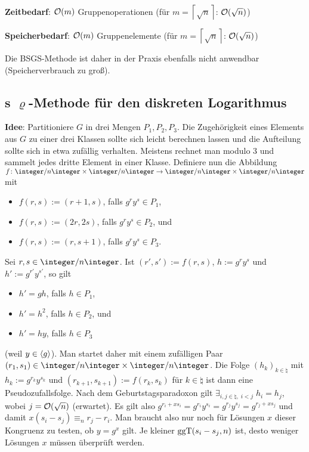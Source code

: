 \linie

\textbf{Zeitbedarf}:
$\mathcal{O}(m)$ Gruppenoperationen (für $m = \left\lceil\sqrt{n}\right\rceil$: $\mathcal{O}(\sqrt{n})$)

\textbf{Speicherbedarf}:
$\mathcal{O}(m)$ Gruppenelemente (für $m = \left\lceil\sqrt{n}\right\rceil$: $\mathcal{O}(\sqrt{n})$)

Die BSGS-Methode ist daher in der Praxis ebenfalls nicht anwendbar (Speicherverbrauch zu groß).

\pagebreak

\subsection{%
    s \texorpdfstring{$\varrho$}{ρ}-Methode für den diskreten Logarithmus%
}

\textbf{Idee}:
Partitioniere $G$ in drei Mengen $P_1, P_2, P_3$.
Die Zugehörigkeit eines Elements aus $G$ zu einer drei Klassen sollte sich leicht berechnen
lassen und die Aufteilung sollte sich in etwa zufällig verhalten.
Meistens rechnet man modulo $3$ und sammelt jedes dritte Element in einer Klasse.
Definiere nun die Abbildung $f\colon \ZnZ \times \ZnZ \rightarrow \ZnZ \times \ZnZ$ mit
\begin{itemize}
    \item
    $f(r, s) := (r + 1, s)$, falls $g^r y^s \in P_1$,
    
    \item
    $f(r, s) := (2r, 2s)$, falls $g^r y^s \in P_2$, und
    
    \item
    $f(r, s) := (r, s + 1)$, falls $g^r y^s \in P_3$.
\end{itemize}
Sei $r, s \in \ZnZ$.
Ist $(r', s') := f(r, s)$, $h := g^r y^s$ und $h' := g^{r'} y^{s'}$, so gilt
\begin{itemize}
    \item
    $h' = gh$, falls $h \in P_1$,
    
    \item
    $h' = h^2$, falls $h \in P_2$, und
    
    \item
    $h' = hy$, falls $h \in P_3$
\end{itemize}
(weil $y \in \langle g\rangle$).
Man startet daher mit einem zufälligen Paar $(r_1, s_1) \in \ZnZ \times \ZnZ$.
Die Folge $(h_k)_{k \in \natural}$ mit $h_k := g^{r_k} y^{s_k}$ und
$(r_{k+1}, s_{k+1}) := f(r_k, s_k)$ für $k \in \natural$ ist dann eine Pseudozufallsfolge.
Nach dem Geburtstagsparadoxon gilt $\exists_{i, j \in \natural,\; i < j}\; h_i = h_j$, wobei
$j = \mathcal{O}(\sqrt{n})$ (erwartet).
Es gilt also $g^{r_i+xs_i} = g^{r_i} y^{s_i} = g^{r_j} y^{s_j} = g^{r_j+xs_j}$
und damit $x(s_i - s_j) \equiv_n r_j - r_i$.
Man braucht also nur noch für Lösungen $x$ dieser Kongruenz zu testen, ob $y = g^x$ gilt.
Je kleiner $\operatorname{ggT}(s_i - s_j, n)$ ist, desto weniger Lösungen $x$ müssen überprüft werden.

